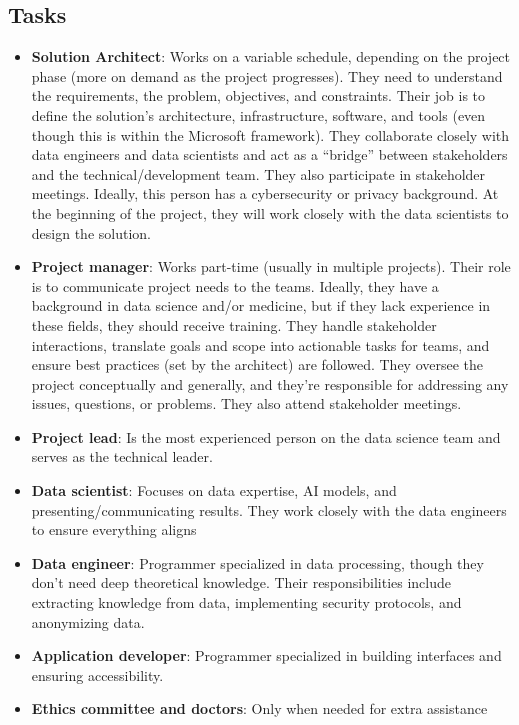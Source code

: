 \subsection{Tasks}\label{subsec:tasks}
\begin{itemize}
    \item \textbf{Solution Architect}: Works on a variable schedule, depending on the project phase (more on demand as the project progresses).
    They need to understand the requirements, the problem, objectives, and constraints.
    Their job is to define the solution’s architecture, infrastructure, software, and tools (even though this is within the Microsoft framework).
    They collaborate closely with data engineers and data scientists and act as a ``bridge'' between stakeholders and the technical/development team.
    They also participate in stakeholder meetings.
    Ideally, this person has a cybersecurity or privacy background.
    At the beginning of the project, they will work closely with the data scientists to design the solution.

    \item \textbf{Project manager}: Works part-time (usually in multiple projects).
    Their role is to communicate project needs to the teams.
    Ideally, they have a background in data science and/or medicine, but if they lack experience in these fields, they should receive training.
    They handle stakeholder interactions, translate goals and scope into actionable tasks for teams, and ensure best practices (set by the architect) are followed.
    They oversee the project conceptually and generally, and they’re responsible for addressing any issues, questions, or problems.
    They also attend stakeholder meetings.

    \item \textbf{Project lead}: Is the most experienced person on the data science team and serves as the technical leader.

    \item \textbf{Data scientist}: Focuses on data expertise, AI models, and presenting/communicating results.
    They work closely with the data engineers to ensure everything aligns

    \item \textbf{Data engineer}: Programmer specialized in data processing, though they don’t need deep theoretical knowledge.
    Their responsibilities include extracting knowledge from data, implementing security protocols, and anonymizing data.

    \item \textbf{Application developer}: Programmer specialized in building interfaces and ensuring accessibility.

    \item \textbf{Ethics committee and doctors}: Only when needed for extra assistance
\end{itemize}

